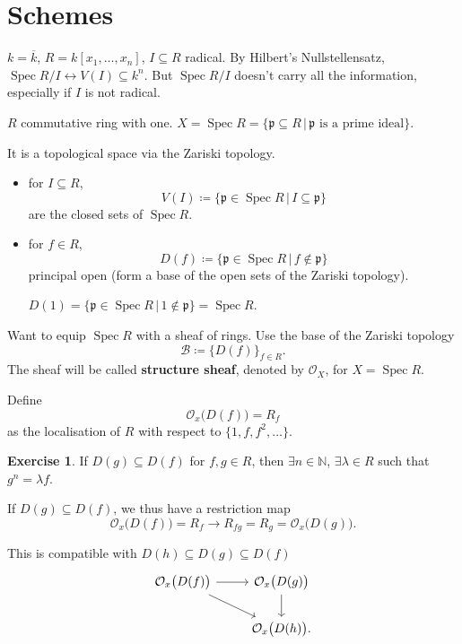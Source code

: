 \documentclass[12pt]{article}
\DeclareMathOperator{\Spec}{Spec}
\theoremstyle{definition}
\newtheorem*{exercise}{Exercise}
\begin{document}
\section{Schemes}
$k=\overline{k}$, $R=k[x_1,\ldots,x_n]$, $I\subseteq R$ radical. By Hilbert's Nullstellensatz, $\Spec R/I\leftrightarrow V(I)\subseteq k^n$. But $\Spec R/I$ doesn't carry all the information, especially if $I$ is not radical.

$R$ commutative ring with one. $X=\Spec R=\{\mathfrak{p}\subseteq R\,|\,\mathfrak{p}\text{ is a prime ideal}\}$.

It is a topological space via the Zariski topology.

\begin{itemize}
\item for $I\subseteq R$,
\[V(I)\coloneqq\{\mathfrak{p}\in\Spec R\,|\,I\subseteq\mathfrak{p}\}\]
are the closed sets of $\Spec R$.

\item for $f\in R$,
\[D(f)\coloneqq\{\mathfrak{p}\in\Spec R\,|\,f\notin\mathfrak{p}\}\]
principal open (form a base of the open sets of the Zariski topology).

$D(1)=\{\mathfrak{p}\in\Spec R\,|\,1\notin\mathfrak{p}\}=\Spec R$.
\end{itemize}

Want to equip $\Spec R$ with a sheaf of rings. Use the base of the Zariski topology
\[\mathcal{B}\coloneqq\big\{D(f)\big\}_{f\in R}.\]
The sheaf will be called \textbf{structure sheaf}, denoted by $\mathcal{O}_X$, for $X=\Spec R$.

Define
\[\mathcal{O}_x\big(D(f)\big)=R_f\]
as the localisation of $R$ with respect to $\{1,f,f^2,\ldots\}$.

\begin{exercise}
If $D(g)\subseteq D(f)$ for $f,g\in R$, then $\exists n\in\mathbb{N}$, $\exists\lambda\in R$ such that $g^n=\lambda f$.
\end{exercise}

If $D(g)\subseteq D(f)$, we thus have a restriction map
\[\mathcal{O}_x\big(D(f)\big)=R_f\longrightarrow R_{fg}=R_g=\mathcal{O}_x\big(D(g)\big).\]

This is compatible with $D(h)\subseteq D(g)\subseteq D(f)$
\[
\begin{tikzcd}
\mathcal{O}_x\big(D(f)\big)\arrow[r]\arrow[rd]&\mathcal{O}_x\big(D(g)\big)\arrow[d]\\
&\mathcal{O}_x\big(D(h)\big).
\end{tikzcd}
\]
\end{document}
